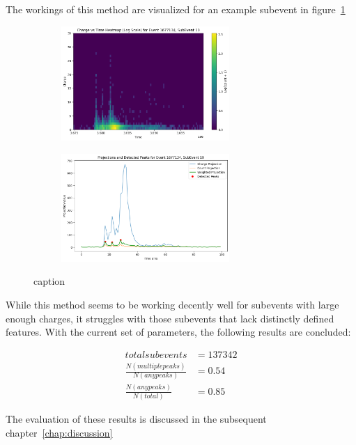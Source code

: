 The workings of this method are visualized for an example subevent in figure~\ref{fig:find_peaks}

\begin{figure}[ht]
    \centering
    \begin{subfigure}[b]{\textwidth}
        \centering
        \includegraphics[width=0.7\textwidth]{Plots/peak_heat_1.pdf.png}
    \end{subfigure}
    \vspace{1em} %
    \begin{subfigure}[b]{\textwidth}
        \centering
        \includegraphics[width=0.7\textwidth]{Plots/peak_plot_1.png}
    \end{subfigure}
    \caption{caption}
    \label{fig:find_peaks}
\end{figure}

While this method seems to be working decently well for subevents with large enough charges, it struggles with those subevents that lack distinctly defined 
features. With the current set of parameters, the following results are concluded:

\begin{align}
    total subevents &= 137342 \\
    \frac{N(multiple peaks)}{N(any peaks)} &= 0.54 \\
    \frac{N(any peaks)}{N(total)} &= 0.85
\end{align}

The evaluation of these results is discussed in the subsequent chapter~\ref{chap:discussion}










